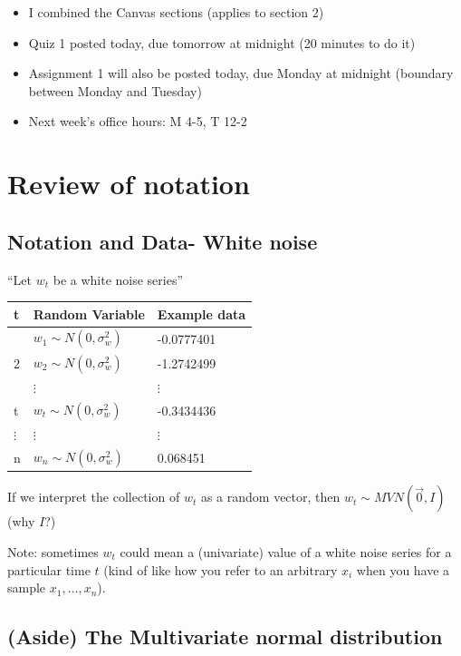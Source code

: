 \documentclass[
  letterpaper,
  DIV=11,
  numbers=noendperiod]{scrreprt}
\providecommand{\tightlist}{%
  \setlength{\itemsep}{0pt}\setlength{\parskip}{0pt}}\usepackage{longtable,booktabs,array}
\begin{document}
\begin{itemize}
\tightlist
\item
  I combined the Canvas sections (applies to section 2)
\item
  Quiz 1 posted today, due tomorrow at midnight (20 minutes to do it)
\item
  Assignment 1 will also be posted today, due Monday at midnight
  (boundary between Monday and Tuesday)
\item
  Next week's office hours: M 4-5, T 12-2
\end{itemize}

\chapter{Review of notation}\label{review-of-notation}

\section{Notation and Data- White
noise}\label{notation-and-data--white-noise}

``Let \(w_t\) be a white noise series''

\begin{longtable}[]{@{}lll@{}}
\toprule\noalign{}
t & Random Variable & Example data \\
\midrule\noalign{}
\endhead
\bottomrule\noalign{}
\endlastfoot
1 & \(w_1 \sim N(0, \sigma_w^2)\) & -0.0777401 \\
2 & \(w_2 \sim N(0, \sigma_w^2)\) & -1.2742499 \\
& \(\vdots\) & \(\vdots\) \\
t & \(w_t \sim N(0, \sigma^2_w)\) & -0.3434436 \\
\(\vdots\) & \(\vdots\) & \(\vdots\) \\
n & \(w_n \sim N(0, \sigma_w^2)\) & 0.068451 \\
\end{longtable}

If we interpret the collection of \(w_t\) as a random vector, then
\(w_t \sim MVN(\vec{0}, I)\) (why \(I\)?)

Note: sometimes \(w_t\) could mean a (univariate) value of a white noise
series for a particular time \(t\) (kind of like how you refer to an
arbitrary \(x_i\) when you have a sample \(x_1, \dots, x_n\)).

\section{\texorpdfstring{{(Aside) The Multivariate normal
distribution}}{(Aside) The Multivariate normal distribution}}\label{aside-the-multivariate-normal-distribution}
\end{document}
